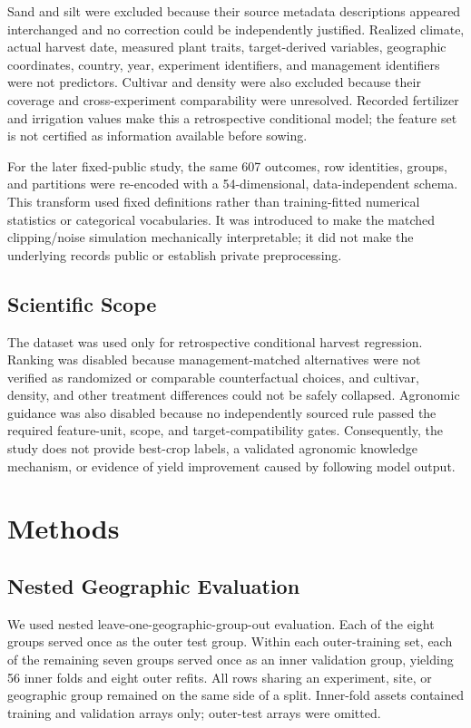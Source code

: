 \documentclass[journal]{IEEEtran}
\begin{document}
Sand and silt were excluded because their source metadata descriptions appeared
interchanged and no correction could be independently justified. Realized
climate, actual harvest date, measured plant traits, target-derived variables,
geographic coordinates, country, year, experiment identifiers, and management
identifiers were not predictors. Cultivar and density were also excluded because
their coverage and cross-experiment comparability were unresolved. Recorded
fertilizer and irrigation values make this a retrospective conditional model;
the feature set is not certified as information available before sowing.

For the later fixed-public study, the same 607 outcomes, row identities, groups,
and partitions were re-encoded with a 54-dimensional, data-independent schema.
This transform used fixed definitions rather than training-fitted numerical
statistics or categorical vocabularies. It was introduced to make the matched
clipping/noise simulation mechanically interpretable; it did not make the
underlying records public or establish private preprocessing.

\subsection{Scientific Scope}

The dataset was used only for retrospective conditional harvest regression.
Ranking was disabled because management-matched alternatives were not verified
as randomized or comparable counterfactual choices, and cultivar, density, and
other treatment differences could not be safely collapsed. Agronomic guidance
was also disabled because no independently sourced rule passed the required
feature-unit, scope, and target-compatibility gates. Consequently, the study
does not provide best-crop labels, a validated agronomic knowledge mechanism,
or evidence of yield improvement caused by following model output.

\section{Methods}

\subsection{Nested Geographic Evaluation}

We used nested leave-one-geographic-group-out evaluation. Each of the eight
groups served once as the outer test group. Within each outer-training set, each
of the remaining seven groups served once as an inner validation group, yielding
56 inner folds and eight outer refits. All rows sharing an experiment, site, or
geographic group remained on the same side of a split. Inner-fold assets
contained training and validation arrays only; outer-test arrays were omitted.
\end{document}
